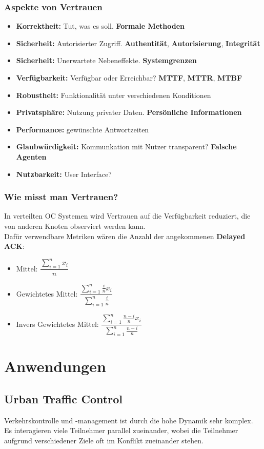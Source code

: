 \documentclass[a4paper]{article}
\begin{document}
\subsubsection{Aspekte von Vertrauen}
\begin{itemize}
	\item \textbf{Korrektheit:} Tut, was es soll. \textbf{Formale Methoden}
	\item \textbf{Sicherheit:} Autorisierter Zugriff. \textbf{Authentität}, \textbf{Autorisierung}, \textbf{Integrität}
	\item \textbf{Sicherheit:} Unerwartete Nebeneffekte. \textbf{Systemgrenzen}
	\item \textbf{Verfügbarkeit:} Verfügbar oder Erreichbar? \textbf{MTTF}, \textbf{MTTR}, \textbf{MTBF}
	\item \textbf{Robustheit:} Funktionalität unter verschiedenen Konditionen
	\item \textbf{Privatsphäre:} Nutzung privater Daten. \textbf{Persönliche Informationen}
	\item \textbf{Performance:} gewünschte Antwortzeiten
	\item \textbf{Glaubwürdigkeit:} Kommunkation mit Nutzer transparent? \textbf{Falsche Agenten}
	\item \textbf{Nutzbarkeit:} User Interface?
\end{itemize}
\subsubsection{Wie misst man Vertrauen?}
In verteilten OC Systemen wird Vertrauen auf die Verfügbarkeit reduziert, die von anderen Knoten observiert werden kann.\\

Dafür verwendbare Metriken wären die Anzahl der angekommenen \textbf{Delayed ACK}:
\begin{itemize}
	\item Mittel: $\dfrac{\sum_{i=1}^{n}x_i}{n}$
	\item Gewichtetes Mittel: $\dfrac{\sum_{i=1}^{n}\frac{i}{n}x_i}{\sum_{i=1}^{n}\frac{i}{n}}$
	\item Invers Gewichtetes Mittel: $\dfrac{\sum_{i=1}^{n}\frac{n-i}{n}x_i}{\sum_{i=1}^{n}\frac{n-i}{n}}$
\end{itemize}
\newpage

\section{Anwendungen}
\subsection{Urban Traffic Control}
Verkehrskontrolle und -management ist durch die hohe Dynamik sehr komplex. Es interagieren viele Teilnehmer parallel zueinander, wobei die Teilnehmer aufgrund verschiedener Ziele oft im Konflikt zueinander stehen.\\
\end{document}
